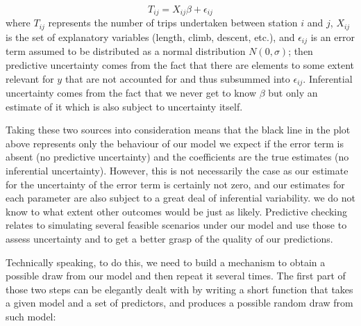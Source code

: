 \documentclass[]{book}
\newenvironment{Shaded}{\begin{snugshade}}{\end{snugshade}}
\newcommand{\KeywordTok}[1]{\textcolor[rgb]{0.13,0.29,0.53}{\textbf{#1}}}
\newcommand{\DecValTok}[1]{\textcolor[rgb]{0.00,0.00,0.81}{#1}}
\newcommand{\StringTok}[1]{\textcolor[rgb]{0.31,0.60,0.02}{#1}}
\newcommand{\CommentTok}[1]{\textcolor[rgb]{0.56,0.35,0.01}{\textit{#1}}}
\newcommand{\ControlFlowTok}[1]{\textcolor[rgb]{0.13,0.29,0.53}{\textbf{#1}}}
\newcommand{\OperatorTok}[1]{\textcolor[rgb]{0.81,0.36,0.00}{\textbf{#1}}}
\newcommand{\NormalTok}[1]{#1}
\begin{document}
\[
T_{ij} = X_{ij}\beta + \epsilon_{ij}
\] where \(T_{ij}\) represents the number of trips undertaken between
station \(i\) and \(j\), \(X_{ij}\) is the set of explanatory variables
(length, climb, descent, etc.), and \(\epsilon_{ij}\) is an error term
assumed to be distributed as a normal distribution \(N(0, \sigma)\);
then predictive uncertainty comes from the fact that there are elements
to some extent relevant for \(y\) that are not accounted for and thus
subsummed into \(\epsilon_{ij}\). Inferential uncertainty comes from the
fact that we never get to know \(\beta\) but only an estimate of it
which is also subject to uncertainty itself.

Taking these two sources into consideration means that the black line in
the plot above represents only the behaviour of our model we expect if
the error term is absent (no predictive uncertainty) and the
coefficients are the true estimates (no inferential uncertainty).
However, this is not necessarily the case as our estimate for the
uncertainty of the error term is certainly not zero, and our estimates
for each parameter are also subject to a great deal of inferential
variability. we do not know to what extent other outcomes would be just
as likely. Predictive checking relates to simulating several feasible
scenarios under our model and use those to assess uncertainty and to get
a better grasp of the quality of our predictions.

Technically speaking, to do this, we need to build a mechanism to obtain
a possible draw from our model and then repeat it several times. The
first part of those two steps can be elegantly dealt with by writing a
short function that takes a given model and a set of predictors, and
produces a possible random draw from such model:

\begin{Shaded}
\end{Shaded}
\end{document}
